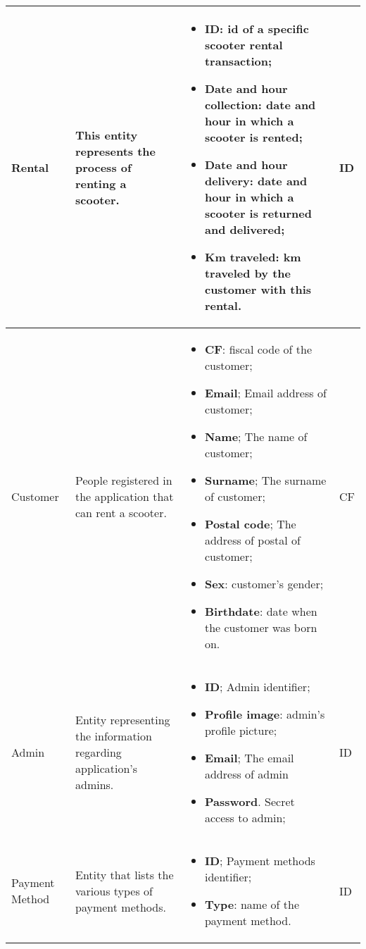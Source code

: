 \begin{longtable}{|p{}|p{} |p{}|p{} |}
Rental & This entity represents the process of renting a scooter. & 
\begin{itemize}
    \vspace{-1em}
    \item \textbf{ID}: id of a specific scooter rental transaction;
    \item \textbf{Date and hour collection}: date and hour in which a scooter is rented;
    \item \textbf{Date and hour delivery}: date and hour in which a scooter is returned  and delivered;
    \item \textbf{Km traveled}: km traveled by the customer with this rental.
 \end{itemize} & ID \\\hline

Customer & People registered in the application that can rent a scooter. & 
\begin{itemize}
    \vspace{-1em}
    \item \textbf{CF}: fiscal code of the customer;
    \item \textbf{Email}; Email address of customer;
    \item \textbf{Name}; The name of customer;
    \item \textbf{Surname}; The surname of customer;
    \item \textbf{Postal code}; The address of postal of customer;
    \item \textbf{Sex}: customer's gender;
    \item \textbf{Birthdate}: date when the customer was born on. 
\end{itemize} & CF \\\hline

Admin & Entity representing the information regarding application's admins. & 
\begin{itemize}
    \vspace{-1em}
    \item \textbf{ID}; Admin identifier; 
    \item \textbf{Profile image}: admin's profile picture;
    \item \textbf{Email}; The email address of admin
    \item \textbf{Password}. Secret access to admin; 
\end{itemize} & ID \\\hline

Payment Method & Entity that lists the various types of payment methods. & 
\begin{itemize}
    \vspace{-1em}
    \item \textbf{ID}; Payment methods identifier; 
    \item \textbf{Type}: name of the payment method.
\end{itemize} & ID \\\hline


\end{longtable}
